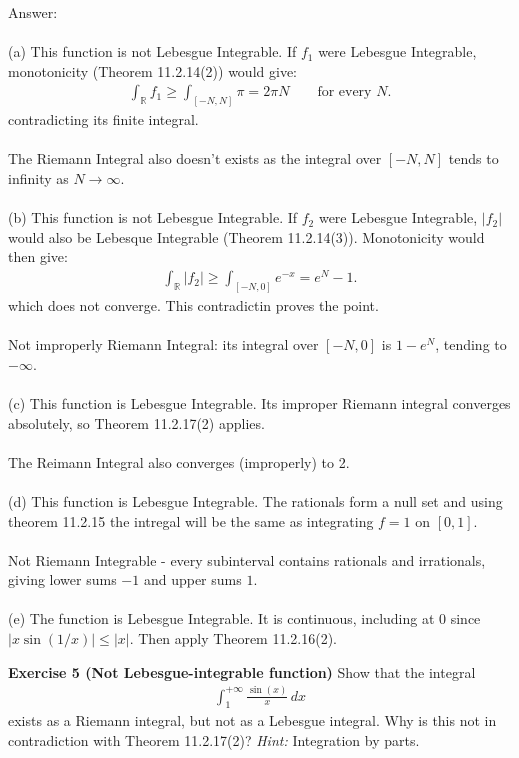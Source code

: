 \documentclass[12pt,a4paper]{article}
\begin{document}
\vspace{1cm}
\noindent
Answer:\\
\\
(a) This function is not Lebesgue Integrable.  If $f_1$ were Lebesgue Integrable, monotonicity (Theorem 11.2.14(2)) would give:
\begin{align*}
\int_{\mathbb{R}} f_1 \geq \int_{[-N,N]} \pi = 2\pi N
\qquad \text{for every } N.
\end{align*}
contradicting its finite integral.\\
\\
The Riemann Integral also doesn't exists as the integral over $[-N,N]$ tends to infinity as $N \to \infty$.\\
\\
(b) This function is not Lebesgue Integrable. If $f_2$ were Lebesgue Integrable, $|f_2|$ would also be Lebesque Integrable (Theorem 11.2.14(3)). Monotonicity would then give:
\begin{align*}
\int_{\mathbb{R}} |f_2| \geq \int_{[-N,0]} e^{-x} = e^N - 1.
\end{align*}
which does not converge.  This contradictin proves the point.\\
\\
Not improperly Riemann Integral: its integral over $[-N,0]$ is $1-e^N$, tending to $-\infty$.\\
\\
(c) This function is Lebesgue Integrable.  Its improper Riemann integral converges absolutely, so Theorem 11.2.17(2) applies.\\
\\
The Reimann Integral also converges (improperly) to 2.\\
\\
(d) This function is Lebesgue Integrable.  The rationals form a null set and using theorem 11.2.15 the intregal will
be the same as integrating $f=1$ on $[0,1]$.\\
\\
Not Riemann Integrable - every subinterval contains rationals and irrationals, giving lower sums $-1$ and upper sums $1$.\\
\\
(e) The function is Lebesgue Integrable.  It is continuous, including at 0 since $|x \sin(1/x)| \le |x|$. Then apply 
Theorem 11.2.16(2).

\newpage
\noindent
\textbf{Exercise 5 (Not Lebesgue-integrable function)}
Show that the integral
\begin{align*}
\int_1^{+\infty} \frac{\sin(x)}{x}\,dx
\end{align*}
exists as a Riemann integral, but not as a Lebesgue integral. Why is this not in contradiction with Theorem 11.2.17(2)? \textit{Hint:} Integration by parts.
\end{document}
